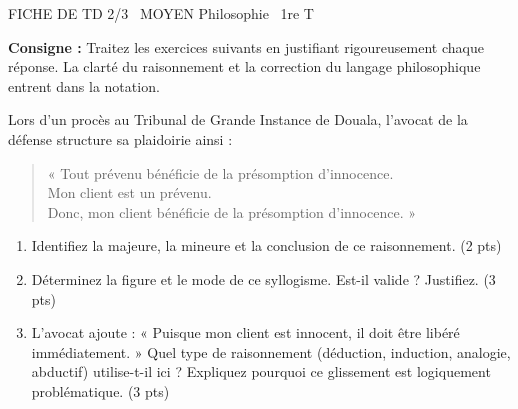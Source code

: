 \documentclass[11pt]{article}
\begin{document}
\begin{tcolorbox}[enhanced,colback=popink,colframe=popink,arc=10pt,boxrule=0pt,left=12pt,right=12pt,top=9pt,bottom=9pt]
{\color{white}\popxbold\small FICHE DE TD 2/3 \textbullet\ MOYEN \hfill Philosophie \textbullet\ 1re T\par}
\end{tcolorbox}
\vspace{4pt}
\noindent\textbf{Consigne :} Traitez les exercices suivants en justifiant rigoureusement chaque réponse. La clarté du raisonnement et la correction du langage philosophique entrent dans la notation.

\begin{exercice}
Lors d'un procès au Tribunal de Grande Instance de Douala, l'avocat de la défense structure sa plaidoirie ainsi :
\begin{quote}
« Tout prévenu bénéficie de la présomption d'innocence.\\
Mon client est un prévenu.\\
Donc, mon client bénéficie de la présomption d'innocence. »
\end{quote}
\begin{enumerate}
    \item Identifiez la majeure, la mineure et la conclusion de ce raisonnement. (2 pts)
    \item Déterminez la figure et le mode de ce syllogisme. Est-il valide ? Justifiez. (3 pts)
    \item L'avocat ajoute : « Puisque mon client est innocent, il doit être libéré immédiatement. » Quel type de raisonnement (déduction, induction, analogie, abductif) utilise-t-il ici ? Expliquez pourquoi ce glissement est logiquement problématique. (3 pts)
\end{enumerate}
\end{exercice}
\end{document}

